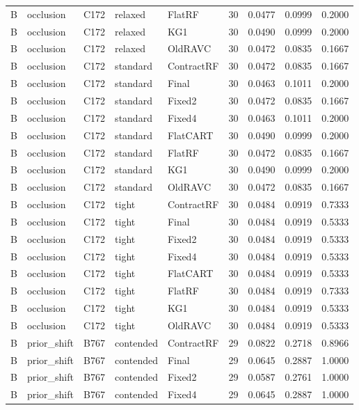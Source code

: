 \begin{longtable}{@{}lllllllll@{}}
B & occlusion & C172 & relaxed & FlatRF & 30 & 0.0477 & 0.0999 & 0.2000\\
B & occlusion & C172 & relaxed & KG1 & 30 & 0.0490 & 0.0999 & 0.2000\\
B & occlusion & C172 & relaxed & OldRAVC & 30 & 0.0472 & 0.0835 & 0.1667\\
B & occlusion & C172 & standard & ContractRF & 30 & 0.0472 & 0.0835 & 0.1667\\
B & occlusion & C172 & standard & Final & 30 & 0.0463 & 0.1011 & 0.2000\\
B & occlusion & C172 & standard & Fixed2 & 30 & 0.0472 & 0.0835 & 0.1667\\
B & occlusion & C172 & standard & Fixed4 & 30 & 0.0463 & 0.1011 & 0.2000\\
B & occlusion & C172 & standard & FlatCART & 30 & 0.0490 & 0.0999 & 0.2000\\
B & occlusion & C172 & standard & FlatRF & 30 & 0.0472 & 0.0835 & 0.1667\\
B & occlusion & C172 & standard & KG1 & 30 & 0.0490 & 0.0999 & 0.2000\\
B & occlusion & C172 & standard & OldRAVC & 30 & 0.0472 & 0.0835 & 0.1667\\
B & occlusion & C172 & tight & ContractRF & 30 & 0.0484 & 0.0919 & 0.7333\\
B & occlusion & C172 & tight & Final & 30 & 0.0484 & 0.0919 & 0.5333\\
B & occlusion & C172 & tight & Fixed2 & 30 & 0.0484 & 0.0919 & 0.5333\\
B & occlusion & C172 & tight & Fixed4 & 30 & 0.0484 & 0.0919 & 0.5333\\
B & occlusion & C172 & tight & FlatCART & 30 & 0.0484 & 0.0919 & 0.5333\\
B & occlusion & C172 & tight & FlatRF & 30 & 0.0484 & 0.0919 & 0.7333\\
B & occlusion & C172 & tight & KG1 & 30 & 0.0484 & 0.0919 & 0.5333\\
B & occlusion & C172 & tight & OldRAVC & 30 & 0.0484 & 0.0919 & 0.5333\\
B & prior\_shift & B767 & contended & ContractRF & 29 & 0.0822 & 0.2718 & 0.8966\\
B & prior\_shift & B767 & contended & Final & 29 & 0.0645 & 0.2887 & 1.0000\\
B & prior\_shift & B767 & contended & Fixed2 & 29 & 0.0587 & 0.2761 & 1.0000\\
B & prior\_shift & B767 & contended & Fixed4 & 29 & 0.0645 & 0.2887 & 1.0000\\

\end{longtable}
